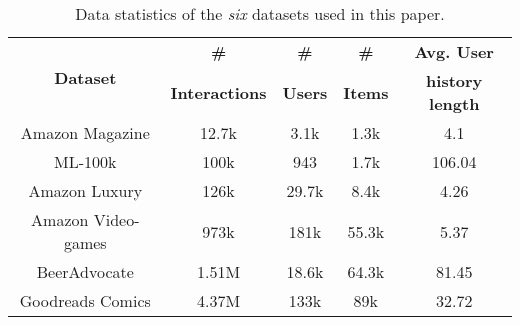 \begin{table}[!ht]
    \begin{footnotesize} %
    \begin{center}
        \begin{tabular}{c | c c c c}
            \toprule
            \multirow{2}{*}{\textbf{Dataset}} & \textbf{\#} & \textbf{\#} & \textbf{\#} & \textbf{Avg. User} \\ 
            & \textbf{Interactions} & \textbf{Users} & \textbf{Items} & \textbf{history length} \\
            \midrule
            
            Amazon Magazine      & 12.7k & 3.1k  & 1.3k  & 4.1 \\
            ML-100k              & 100k  & 943   & 1.7k  & 106.04 \\
            Amazon Luxury        & 126k  & 29.7k & 8.4k  & 4.26 \\
            Amazon Video-games   & 973k  & 181k  & 55.3k & 5.37 \\
            BeerAdvocate         & 1.51M & 18.6k & 64.3k & 81.45 \\
            Goodreads Comics     & 4.37M & 133k  & 89k   & 32.72 \\
            
            \bottomrule
        \end{tabular}
    \end{center}
    \end{footnotesize}
    \vspace{2mm}
    \caption{Data statistics of the \emph{six} datasets used in this paper.}
    \label{data_stats}
    \vspace{-6mm} %
\end{table}